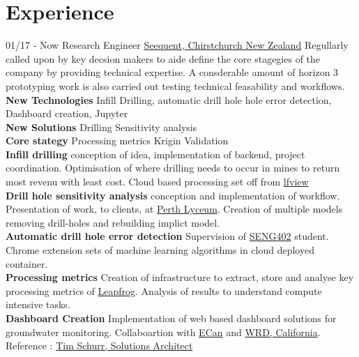\documentclass[]{friggeri-cv}
\begin{document}
\section{Experience}
\begin{entrylist}
  \entry
    {01/17 - Now}
    {Research Engineer}
    {\href{https://www.seequent.com/}{Seequent, Chirstchurch New Zealand}}
    {Regullarly called upon by key decsion makers to aide define the core stagegies of the company by providing technical expertise. A consderable amount of horizon 3 prototyping work is also carried out testing technical feasability and workflows.
    \\[6pt]
   	\textbf{New Technologies}
   	Infill Drilling, automatic drill hole hole error detection, Dashboard creation, Jupyter
   	\\[6pt]
   	\textbf{New Solutions}
   	Drilling Sensitivity analysis
    \\[6pt]
   	\textbf{Core stategy}
   	Processing metrics	
   	Krigin Validation
    \\[6pt]	
    \textbf{Infill drilling} conception of idea, implementation of backend, project coordination. Optimisation of where drilling needs to occur in mines to return most revenu with least cost. Cloud based processing set off from \href{https://www.lfview.com}{lfview}
    \\[6pt]
    \textbf{Drill hole sensitivity analysis} conception and implementation of workflow. Presentation of work, to clients, at \href{https://lyceum-perth.seequent.com/}{Perth Lyceum}. Creation of multiple models removing drill-holes and rebuilding implict model.
    \\[6pt]
    \textbf{Automatic drill hole error detection} Supervision of \href{https://www.canterbury.ac.nz/courseinfo/GetCourseDetails.aspx?course=SENG402\&occurrence=18W(C)\&year=2018}{SENG402} student. Chrome extension sets of machine learning algorithms in cloud deployed container.
    \\[6pt]
    \textbf{Processing metrics} Creation of infrastructure to extract, store and analyse key processing metrics of \href{https://www.leapfrog3d.com/}{Leapfrog}. Analysis of results to understand compute intensive tasks.
    \\[6pt]
    \textbf{Dashboard Creation} Implementation of web based dashboard solutions for groundwater monitoring. Collaboartion with \href{https://ecan.govt.nz/}{ECan} and \href{https://www.wrd.org/}{WRD, California}.
    \\
    Reference : \href{mailto:tim.schurr@seequent.com}{Tim Schurr, Solutions Architect}
}
\end{entrylist}
\end{document}
